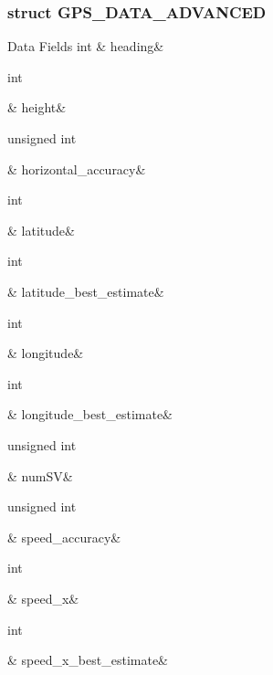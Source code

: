 \subsubsection{struct G\-P\-S\-\_\-\-D\-A\-T\-A\-\_\-\-A\-D\-V\-A\-N\-C\-E\-D}
\begin{DoxyFields}{Data Fields}
\hypertarget{a00004_aa0a9c2882aad6535e52a6d429f1d42da}{int}\label{a00004_aa0a9c2882aad6535e52a6d429f1d42da}
&
heading&
\\
\hline

\hypertarget{a00004_ad12fc34ce789bce6c8a05d8a17138534}{int}\label{a00004_ad12fc34ce789bce6c8a05d8a17138534}
&
height&
\\
\hline

\hypertarget{a00004_a2c6f1022b2ac45d5e6238951dc81d77a}{unsigned int}\label{a00004_a2c6f1022b2ac45d5e6238951dc81d77a}
&
horizontal\-\_\-accuracy&
\\
\hline

\hypertarget{a00004_a5bf9aac20fe4e7a73cd1a9fc30d7ae00}{int}\label{a00004_a5bf9aac20fe4e7a73cd1a9fc30d7ae00}
&
latitude&
\\
\hline

\hypertarget{a00004_a82a31c4bd32fdcea78aeeee679a04b25}{int}\label{a00004_a82a31c4bd32fdcea78aeeee679a04b25}
&
latitude\-\_\-best\-\_\-estimate&
\\
\hline

\hypertarget{a00004_a17963aafb9acb082fcc06c90195cb4fa}{int}\label{a00004_a17963aafb9acb082fcc06c90195cb4fa}
&
longitude&
\\
\hline

\hypertarget{a00004_a70d64913a348198bfa17a4c00de2c3b0}{int}\label{a00004_a70d64913a348198bfa17a4c00de2c3b0}
&
longitude\-\_\-best\-\_\-estimate&
\\
\hline

\hypertarget{a00004_a9390419b61f0e0bae53f5f094ce82b93}{unsigned int}\label{a00004_a9390419b61f0e0bae53f5f094ce82b93}
&
num\-S\-V&
\\
\hline

\hypertarget{a00004_ac5e7fd2a3a590e4b18a47ec291c52004}{unsigned int}\label{a00004_ac5e7fd2a3a590e4b18a47ec291c52004}
&
speed\-\_\-accuracy&
\\
\hline

\hypertarget{a00004_a20fcaf3d7d5effa75ca571510f53a6cc}{int}\label{a00004_a20fcaf3d7d5effa75ca571510f53a6cc}
&
speed\-\_\-x&
\\
\hline

\hypertarget{a00004_a755d2852a14612e5e2b07fe2efce8e31}{int}\label{a00004_a755d2852a14612e5e2b07fe2efce8e31}
&
speed\-\_\-x\-\_\-best\-\_\-estimate&
\\
\hline


\end{DoxyFields}
